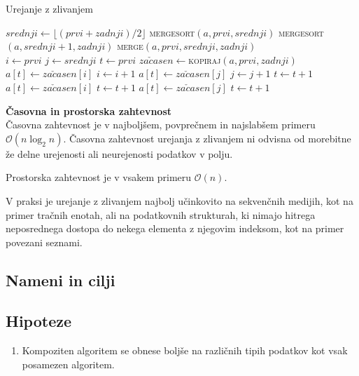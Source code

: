 \documentclass[a4paper,oneside,12pt]{article}
\newcommand{\subsubsubsection}[1]{\vspace*{1ex}\textbf{#1}\\}
\begin{document}
\begin{algorithm}[h!t!]
  \caption{Urejanje z zlivanjem}\label{algo:mergesort}
  \begin{algorithmic}[1]
         \Return \EndIf
        \State $srednji \gets \lfloor(prvi + zadnji) / 2\rfloor$
        \State \textsc{mergesort}$(a, prvi, srednji)$
        \State \textsc{mergesort}$(a, srednji + 1, zadnji)$
        \State \textsc{merge}$(a, prvi, srednji, zadnji)$
    \EndFunction
    \\
        \State $i \gets prvi$
        \State $j \gets srednji$
        \State $t \gets prvi$
        \State $za\check{c}asen \gets$\textsc{kopiraj}$(a, prvi, zadnji)$ 
                \State $a[t] \gets za\check{c}asen[i]$
                \State $i \gets i + 1$
            \Else
                \State $a[t] \gets za\check{c}asen[j]$
                \State $j \gets j + 1$
            \EndIf
            \State $t \gets t + 1$
        \EndWhile
            \State $a[t] \gets za\check{c}asen[i]$
            \State $t \gets t + 1$
        \EndWhile
            \State $a[t] \gets za\check{c}asen[j]$
            \State $t \gets t + 1$
        \EndWhile
    \EndFunction
  \end{algorithmic}
\end{algorithm}

\subsubsubsection{Časovna in prostorska zahtevnost} \nopagebreak
Časovna zahtevnost je v najboljšem, povprečnem in najslabšem primeru 
$\mathcal{O}(n\log_2 n)$. Časovna zahtevnost urejanja z zlivanjem ni odvisna od
morebitne že delne urejenosti ali neurejenosti podatkov v polju. 

Prostorska zahtevnost je v vsakem primeru $\mathcal{O}(n)$. %

V praksi je urejanje z zlivanjem najbolj učinkovito na
sekvenčnih medijih, kot na primer tračnih enotah, ali na podatkovnih strukturah, ki nimajo hitrega
neposrednega dostopa do nekega elementa z njegovim indeksom, kot na primer povezani seznami.

\subsection{Nameni in cilji}

\subsection{Hipoteze}
\begin{enumerate}
  \item \label{hip:komp:vs:nekomp} Kompoziten algoritem se obnese boljše na različnih tipih podatkov kot vsak
    posamezen algoritem.
\end{enumerate}
\end{document}
